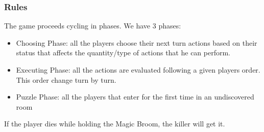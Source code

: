 \subsubsection{Rules}
The game proceeds cycling in phases. We have 3 phases:
\begin{itemize}
\item Choosing Phase: all the players choose their next turn actions based on their status that affects the quantity/type of actions that he can perform.
\item Executing Phase: all the actions are evaluated following a given players order. This order change turn by turn.
\item Puzzle Phase: all the players that enter for the first time in an undiscovered room 
\end{itemize}
If the player dies while holding the Magic Broom, the killer will get it.\\
